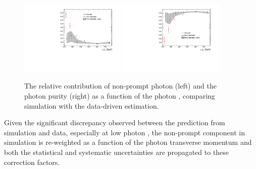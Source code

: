 \begin{figure}[h!]
  \centering
  \includegraphics[width=0.45\textwidth]{figures/photonpurity/fakes} 
  \includegraphics[width=0.45\textwidth]{figures/photonpurity/purity} 
  \caption{\label{fig:photon-purities} 
  The relative contribution of non-prompt photon (left) and
  the photon purity (right) as a function of the photon \pt, 
  comparing simulation with the data-driven estimation. }
\end{figure}

Given the significant discrepancy observed between the prediction from simulation and data, 
especially at low photon \pt, 
the non-prompt component in simulation is re-weighted as a function of the photon transverse momentum 
and both the statistical and systematic uncertainties are propagated to these correction factors. 





